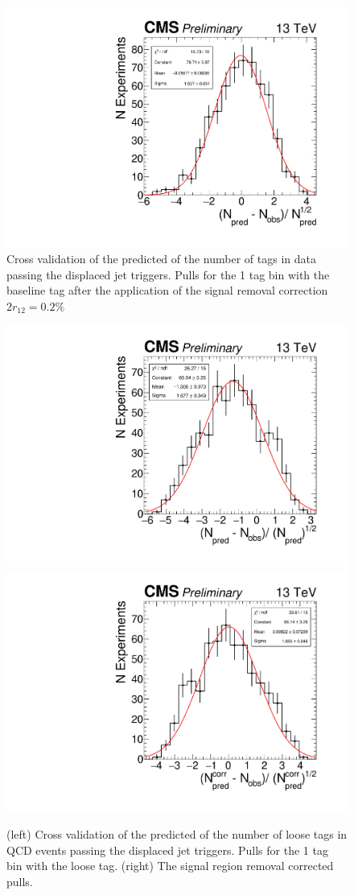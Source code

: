 \begin{figure}
\begin{center}
\includegraphics[width=.45\textwidth]{figures/an/ANALYSIS/pulls/baseline_xval_ndiv25_baseline_1tag.pdf}
\caption{Cross validation of the predicted of the number of tags in data passing the displaced jet triggers. Pulls for the 1 tag bin with the baseline tag after the application of the signal removal correction $2r_{12}=0.2\%$ \label{fig:djetpd_1tag_xval_baseline}}
\end{center}
\end{figure}

\begin{figure}
\begin{center}
\includegraphics[width=.45\textwidth]{figures/an/ANALYSIS/pulls/qcd_loose_uncorrected_1tag.pdf}
\includegraphics[width=.45\textwidth]{figures/an/ANALYSIS/pulls/qcd_loose_corrected_1tag.pdf}
\caption{(left) Cross validation of the predicted of the number of loose tags in QCD events passing the displaced jet triggers. Pulls for the 1 tag bin with the loose tag. (right) The signal region removal corrected pulls. \label{fig:qcd_1tag_xval}}
\end{center}
\end{figure}

